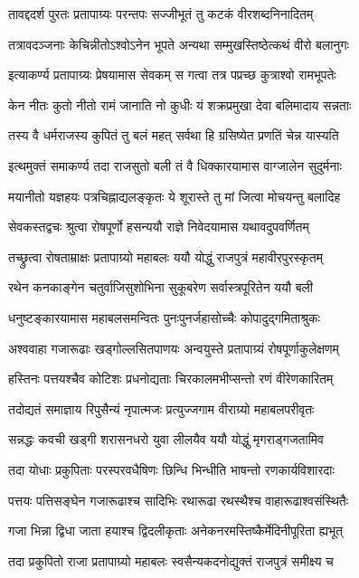 \twolineshloka
{तावद्ददर्श पुरतः प्रतापाग्र्यः परन्तपः}
{सज्जीभूतं तु कटकं वीरशब्दनिनादितम्}%

\twolineshloka
{तत्रावदञ्जनाः केचिन्नीतोऽश्वोऽनेन भूपते}
{अन्यथा सम्मुखस्तिष्ठेत्कथं वीरो बलानुगः}%

\twolineshloka
{इत्याकर्ण्य प्रतापाग्र्यः प्रेषयामास सेवकम्}
{स गत्वा तत्र पप्रच्छ कुत्राश्वो रामभूपतेः}%

\twolineshloka
{केन नीतः कुतो नीतो रामं जानाति नो कुधीः}
{यं शक्रप्रमुखा देवा बलिमादाय सन्नताः}%

\twolineshloka
{तस्य वै धर्मराजस्य कुपितं तु बलं महत्}
{सर्वथा हि ग्रसिष्येत प्रणतिं चेन्न यास्यति}%

\twolineshloka
{इत्थमुक्तं समाकर्ण्य तदा राजसुतो बली}
{तं वै धिक्कारयामास वाग्जालेन सुदुर्मनाः}%

\twolineshloka
{मयानीतो यज्ञहयः पत्रचिह्नाद्यलङ्कृतः}
{ये शूरास्ते तु मां जित्वा मोचयन्तु बलादिह}%

\twolineshloka
{सेवकस्तद्वचः श्रुत्वा रोषपूर्णो हसन्ययौ}
{राज्ञे निवेदयामास यथावदुपवर्णितम्}%

\twolineshloka
{तच्छ्रुत्वा रोषताम्राक्षः प्रतापाग्र्यो महाबलः}
{ययौ योद्धुं राजपुत्रं महावीरपुरस्कृतम्}%

\twolineshloka
{रथेन कनकाङ्गेन चतुर्वाजिसुशोभिना}
{सुकूबरेण सर्वास्त्रपूरितेन ययौ बली}%

\twolineshloka
{धनुष्टङ्कारयामास महाबलसमन्वितः}
{पुनःपुनर्जहासोच्चैः कोपादुद्गमिताश्रुकः}%

\twolineshloka
{अश्ववाहा गजारूढाः खड्गोल्लसितपाणयः}
{अन्वयुस्ते प्रतापाग्र्यं रोषपूर्णाकुलेक्षणम्}%

\twolineshloka
{हस्तिनः पत्तयश्चैव कोटिशः प्रधनोद्यताः}
{चिरकालमभीप्सन्तो रणं वीरेणकारितम्}%

\twolineshloka
{तदोद्यतं समाज्ञाय रिपुसैन्यं नृपात्मजः}
{प्रत्युज्जगाम वीराग्र्यो महाबलपरीवृतः}%

\twolineshloka
{सन्नद्धः कवची खड्गी शरासनधरो युवा}
{लीलयैव ययौ योद्धुं मृगराड्गजतामिव}%

\twolineshloka
{तदा योधाः प्रकुपिताः परस्परवधैषिणः}
{छिन्धि भिन्धीति भाषन्तो रणकार्यविशारदाः}%

\twolineshloka
{पत्तयः पत्तिसङ्घेन गजारूढाश्च सादिभिः}
{रथारूढा रथस्थैश्च वाहारूढाश्वसंस्थितैः}%

\twolineshloka
{गजा भिन्ना द्विधा जाता हयाश्च द्विदलीकृताः}
{अनेकनरमस्तिष्कैर्मेदिनीपूरिता ह्यभूत्}%

\twolineshloka
{तदा प्रकुपितो राजा प्रतापाग्र्यो महाबलः}
{स्वसैन्यकदनोद्युक्तं राजपुत्रं समीक्ष्य च}%

